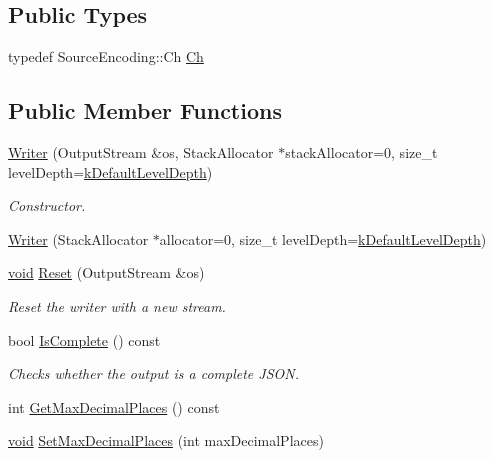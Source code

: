 \subsection*{Public Types}
\begin{DoxyCompactItemize}
\item 
typedef Source\+Encoding\+::\+Ch \hyperlink{classWriter_ab08bff5fd2daec65f4a78779ca3d2139}{Ch}
\end{DoxyCompactItemize}
\subsection*{Public Member Functions}
\begin{DoxyCompactItemize}
\item 
\hyperlink{classWriter_af4f54830d6927d9daf5bd53bfd134dd3}{Writer} (Output\+Stream \&os, Stack\+Allocator $\ast$stack\+Allocator=0, size\+\_\+t level\+Depth=\hyperlink{classWriter_a9cb4caeb9d8971f305edff1d70e67acb}{k\+Default\+Level\+Depth})
\begin{DoxyCompactList}\small\item\em Constructor. \end{DoxyCompactList}\item 
\hyperlink{classWriter_a7b885cea71542fc436be80eff447fb64}{Writer} (Stack\+Allocator $\ast$allocator=0, size\+\_\+t level\+Depth=\hyperlink{classWriter_a9cb4caeb9d8971f305edff1d70e67acb}{k\+Default\+Level\+Depth})
\item 
\hyperlink{imgui__impl__opengl3__loader_8h_ac668e7cffd9e2e9cfee428b9b2f34fa7}{void} \hyperlink{classWriter_a8b53e8f137f7fcf694f5500711b3f58d}{Reset} (Output\+Stream \&os)
\begin{DoxyCompactList}\small\item\em Reset the writer with a new stream. \end{DoxyCompactList}\item 
bool \hyperlink{classWriter_a07d74d36dd3191b06e0aab678c246157}{Is\+Complete} () const
\begin{DoxyCompactList}\small\item\em Checks whether the output is a complete J\+S\+ON. \end{DoxyCompactList}\item 
int \hyperlink{classWriter_ad35ddb56c6969d9584bf1e73bebda5ab}{Get\+Max\+Decimal\+Places} () const
\item 
\hyperlink{imgui__impl__opengl3__loader_8h_ac668e7cffd9e2e9cfee428b9b2f34fa7}{void} \hyperlink{classWriter_a58e3f94dc5af1432a8eace5ba427eca7}{Set\+Max\+Decimal\+Places} (int max\+Decimal\+Places)

\end{DoxyCompactItemize}
